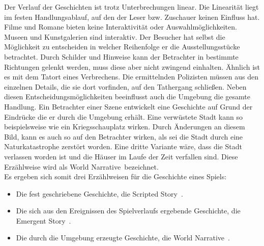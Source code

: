 Der Verlauf der Geschichten ist trotz Unterbrechungen linear. Die Linearität liegt im festen Handlungsablauf, auf den der Leser bzw. Zuschauer keinen Einfluss hat. Filme und Romane bieten keine Interaktivität oder Auswahlmöglichkeiten.
Museen und Kunstgalerien sind interaktiv. Der Besucher hat selbst die Möglichkeit zu entscheiden in welcher Reihenfolge er die Ausstellungsstücke betrachtet. Durch Schilder und Hinweise kann der Betrachter in bestimmte Richtungen gelenkt werden, muss diese aber nicht zwingend einhalten. Ähnlich ist es mit dem Tatort eines Verbrechens. Die ermittelnden Polizisten müssen aus den einzelnen Details, die sie dort vorfinden, auf den Tathergang schließen.  \cite[S. 82]{Adams:1515529}
Neben diesen Entscheidungsmöglichkeiten beeinflusst auch die Umgebung die gesamte Handlung. Ein Betrachter einer Szene entwickelt eine Geschichte auf Grund der Eindrücke die er durch die Umgebung erhält. Eine verwüstete Stadt kann so beispielsweise wie ein Kriegsschauplatz wirken. Durch Änderungen an diesem Bild, kann es auch so auf den Betrachter wirken, als sei die Stadt durch eine Naturkatastrophe zerstört worden. Eine dritte Variante wäre, dass die Stadt verlassen worden ist und die Häuser im Laufe der Zeit verfallen sind. Diese Erzählweise wird als \glqq World Narrative\grqq\ bezeichnet. \cite[S. 86 f.]{Adams:1515529}\\
Es ergeben sich somit drei Erzählweisen für die Geschichte eines Spiels:
\begin{itemize}
\item Die fest geschriebene Geschichte, die \glqq Scripted Story\grqq\ .
\item Die sich aus den Ereignissen des Spielverlaufs ergebende Geschichte, die \glqq Emergent Story\grqq\ .
\item Die durch die Umgebung erzeugte Geschichte, die \glqq World Narrative\grqq\ .
\end{itemize}

